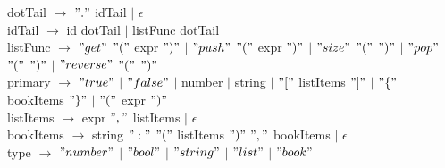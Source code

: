 \documentclass{article}
\begin{document}
dotTail $\rightarrow$ $"."$ idTail $\vert$ $\epsilon$ \\

idTail $\rightarrow$ id dotTail $\vert$ listFunc dotTail \\

listFunc $\rightarrow$ $"get"$ $"("$ expr $")"$ $\vert$ $"push"$ $"("$ expr $")"$ $\vert$ $"size"$ $"("$ $")"$ $\vert$ $"pop"$ $"("$ $")"$ $\vert$ $"reverse"$ $"("$ $")"$ \\

primary $\rightarrow$ $"true"$ $\vert$ $"false"$ $\vert$ number $\vert$ string $\vert$ $"["$ listItems $"]"$ $\vert$ $"\{"$ bookItems $"\}"$ $\vert$ $"("$ expr $")"$ \\

listItems $\rightarrow$ expr $","$ listItems $\vert$ $\epsilon$ \\

bookItems $\rightarrow$ string $":"$ $"("$ listItems $")"$ $","$ bookItems $\vert$ $\epsilon$ \\

type $\rightarrow$ $"number"$ $\vert$ $"bool"$ $\vert$ $"string"$ $\vert$ $"list"$ $\vert$ $"book"$ \\
\end{document}
